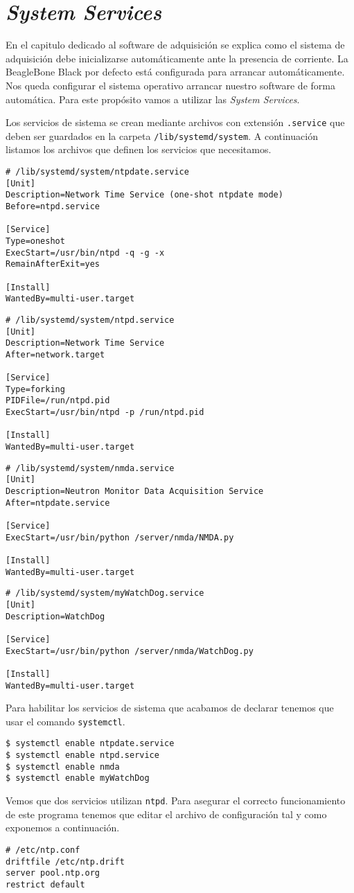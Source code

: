 	\section{\emph{System Services}}
		En el capitulo dedicado al software de adquisición se explica como el sistema de adquisición debe inicializarse automáticamente ante
		la presencia de corriente. La BeagleBone Black por defecto está configurada para arrancar automáticamente. Nos queda configurar el
		sistema operativo arrancar nuestro software de forma automática. Para este propósito vamos a utilizar las \emph{System Services}. 
		\par
		Los servicios de sistema se crean mediante archivos con extensión \texttt{.service} que deben ser guardados en la carpeta
		\texttt{/lib/systemd/system}. A continuación listamos los archivos que definen los servicios que necesitamos.
		\begin{lstlisting}[style=myFile]
# /lib/systemd/system/ntpdate.service
[Unit]
Description=Network Time Service (one-shot ntpdate mode)
Before=ntpd.service

[Service]
Type=oneshot
ExecStart=/usr/bin/ntpd -q -g -x
RemainAfterExit=yes

[Install]
WantedBy=multi-user.target
		\end{lstlisting}
		\begin{lstlisting}[style=myFile]
# /lib/systemd/system/ntpd.service
[Unit]
Description=Network Time Service
After=network.target

[Service]
Type=forking
PIDFile=/run/ntpd.pid
ExecStart=/usr/bin/ntpd -p /run/ntpd.pid

[Install]
WantedBy=multi-user.target
		\end{lstlisting}
		\begin{lstlisting}[style=myFile]
# /lib/systemd/system/nmda.service
[Unit]
Description=Neutron Monitor Data Acquisition Service
After=ntpdate.service

[Service]
ExecStart=/usr/bin/python /server/nmda/NMDA.py

[Install]
WantedBy=multi-user.target
		\end{lstlisting}
		\begin{lstlisting}[style=myFile]
# /lib/systemd/system/myWatchDog.service         
[Unit]
Description=WatchDog

[Service]
ExecStart=/usr/bin/python /server/nmda/WatchDog.py

[Install]
WantedBy=multi-user.target
		\end{lstlisting}
		Para habilitar los servicios de sistema que acabamos de declarar tenemos que usar el comando \texttt{systemctl}.
		\begin{lstlisting}[style=myBash]
$ systemctl enable ntpdate.service
$ systemctl enable ntpd.service
$ systemctl enable nmda
$ systemctl enable myWatchDog
		\end{lstlisting}
		Vemos que dos servicios utilizan \texttt{ntpd}. Para asegurar el correcto funcionamiento de este programa tenemos que editar el
		archivo de configuración tal y como exponemos a continuación.
		\begin{lstlisting}[style=myFile]
# /etc/ntp.conf
driftfile /etc/ntp.drift
server pool.ntp.org
restrict default
		\end{lstlisting}
